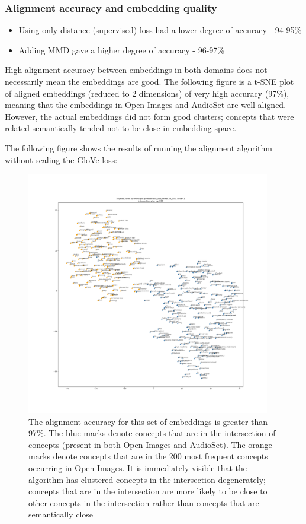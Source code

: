 \subsubsection{Alignment accuracy and embedding quality}

\begin{itemize}
    \item Using only distance (supervised) loss had a lower degree of accuracy - 94-95\% 
    \item Adding MMD gave a higher degree of accuracy - 96-97\%
\end{itemize}

High alignment accuracy between embeddings in both domains does not necessarily mean the embeddings are good. The following figure is a t-SNE plot of aligned embeddings (reduced to 2 dimensions) of very high accuracy (97\%), meaning that the embeddings in Open Images and AudioSet are well aligned. However, the actual embeddings did not form good clusters; concepts that were related semantically tended not to be close in embedding space. 

The following figure shows the results of running the alignment algorithm without scaling the GloVe loss:

\begin{figure}[H]
\label{fig:dysfunctional_clusters}
    \centering
    \includegraphics[width=0.95\textwidth]{images/method/probabilistic_aligned/dysfunctional_clusters.png}
    \caption{
        The alignment accuracy for this set of embeddings is greater than 97\%. The blue marks denote concepts that are in the intersection of concepts (present in both Open Images and AudioSet). The orange marks denote concepts that are in the 200 most frequent concepts occurring in Open Images. It is immediately visible that the algorithm has clustered concepts in the intersection degenerately; concepts that are in the intersection are more likely to be close to other concepts in the intersection rather than concepts that are semantically close
    }
\end{figure}

